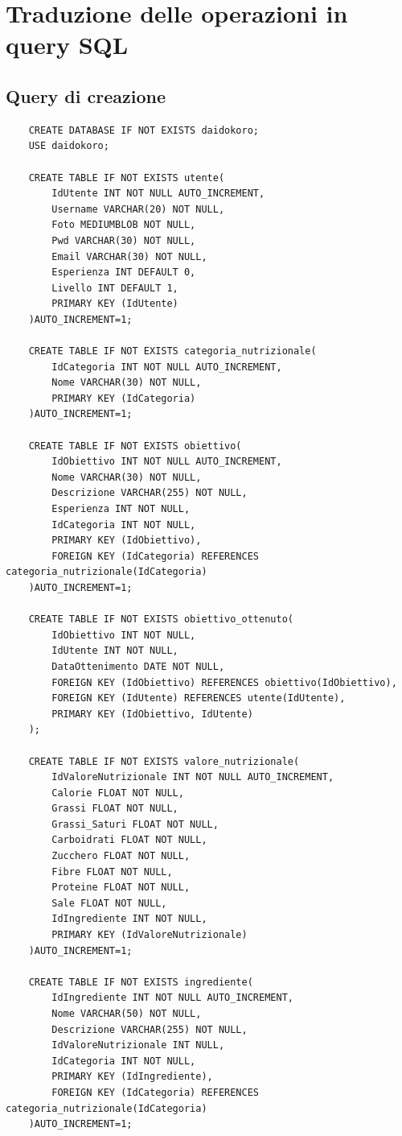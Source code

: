 ﻿\documentclass[a4paper,12pt]{report}
\begin{document}
\section{Traduzione delle operazioni in query SQL}
\subsection{Query di creazione}

\begin{verbatim}
    CREATE DATABASE IF NOT EXISTS daidokoro;
    USE daidokoro;
    
    CREATE TABLE IF NOT EXISTS utente(
        IdUtente INT NOT NULL AUTO_INCREMENT,
        Username VARCHAR(20) NOT NULL,
        Foto MEDIUMBLOB NOT NULL,
        Pwd VARCHAR(30) NOT NULL,
        Email VARCHAR(30) NOT NULL,
        Esperienza INT DEFAULT 0,
        Livello INT DEFAULT 1,
        PRIMARY KEY (IdUtente)
    )AUTO_INCREMENT=1;
    
    CREATE TABLE IF NOT EXISTS categoria_nutrizionale(
        IdCategoria INT NOT NULL AUTO_INCREMENT,
        Nome VARCHAR(30) NOT NULL,
        PRIMARY KEY (IdCategoria)
    )AUTO_INCREMENT=1;
    
    CREATE TABLE IF NOT EXISTS obiettivo(
        IdObiettivo INT NOT NULL AUTO_INCREMENT,
        Nome VARCHAR(30) NOT NULL,
        Descrizione VARCHAR(255) NOT NULL,
        Esperienza INT NOT NULL,
        IdCategoria INT NOT NULL,
        PRIMARY KEY (IdObiettivo),
        FOREIGN KEY (IdCategoria) REFERENCES categoria_nutrizionale(IdCategoria)
    )AUTO_INCREMENT=1;
    
    CREATE TABLE IF NOT EXISTS obiettivo_ottenuto(
        IdObiettivo INT NOT NULL,
        IdUtente INT NOT NULL,
        DataOttenimento DATE NOT NULL,
        FOREIGN KEY (IdObiettivo) REFERENCES obiettivo(IdObiettivo),
        FOREIGN KEY (IdUtente) REFERENCES utente(IdUtente),
        PRIMARY KEY (IdObiettivo, IdUtente)
    );
    
    CREATE TABLE IF NOT EXISTS valore_nutrizionale(
        IdValoreNutrizionale INT NOT NULL AUTO_INCREMENT,
        Calorie FLOAT NOT NULL,
        Grassi FLOAT NOT NULL,
        Grassi_Saturi FLOAT NOT NULL,
        Carboidrati FLOAT NOT NULL,
        Zucchero FLOAT NOT NULL,
        Fibre FLOAT NOT NULL,
        Proteine FLOAT NOT NULL,
        Sale FLOAT NOT NULL,
        IdIngrediente INT NOT NULL,
        PRIMARY KEY (IdValoreNutrizionale)
    )AUTO_INCREMENT=1;
    
    CREATE TABLE IF NOT EXISTS ingrediente(
        IdIngrediente INT NOT NULL AUTO_INCREMENT,
        Nome VARCHAR(50) NOT NULL,
        Descrizione VARCHAR(255) NOT NULL,
        IdValoreNutrizionale INT NULL,
        IdCategoria INT NOT NULL,
        PRIMARY KEY (IdIngrediente),
        FOREIGN KEY (IdCategoria) REFERENCES categoria_nutrizionale(IdCategoria)
    )AUTO_INCREMENT=1;
    

\end{verbatim}
\end{document}
